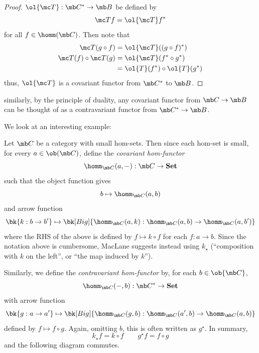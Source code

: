 \documentclass{fkbook}
\theoremstyle{snazzydefinition}
\begin{document}
\begin{adjustwidth}{1em}{1em}
\begin{proof}
    $\ol{\mc T} : \mb C^* \to \mb B$ be defined by
    \[
      \mc T f = \ol{\mc T} f^*
    \]
    for all $f \in \homm(\mb C)$. Then note that
    \begin{align*}
      \mc T(g \circ f)
      &= \ol{\mc T} ((g \circ f)^*) \\
      \mc T(f) \circ \mc T(g)
      &= \ol{\mc T} (f^* \circ g^*) \\
      &= \ol{T}(f^*) \circ \ol{T}(g^*)
    \end{align*}
    thus, $\ol{\mc T}$ is a covariant functor from $\mb C^*$ to $\mb
    B$.
  \end{proof}
  similarly, by the principle of duality, any covariant functor from
  $\mb C \to \mb B$ can be thought of as a contravariant functor from
  $\mb C^* \to \mb B$.

  We look at an interesting example:
  \begin{definition}
    Let $\mb C$ be a category with small hom-sets. Then since each
    hom-set is small, for every $a \in \ob(\mb C)$, define the
    \emph{covariant hom-functor}
    \[
      \homm_{\mb C}(a, -): \mb C \to \textbf{Set}
    \]
    such that the object function gives
    \[
      b \mapsto \homm_{\mb C}(a,b)
    \]
    and arrow function
    \[
      \bk{k : b \to b'} \mapsto \bk[Big]{\homm_{\mb C}(a,k) :
        \homm_{\mb C}(a,b) \to \homm_{\mb C}(a, b')}
    \]
    where the RHS of the above is defined by $f \mapsto k \circ f$ for
    each $f : a \to b$. Since the notation above is cumbersome,
    MacLane suggests instead using $k_\star$ (``composition with $k$ on
    the left'', or ``the map induced by $k$'').

    Similarly, we define the \emph{contravariant hom-functor} by, for
    each $b \in \ob{\mb C}$,
    \[
      \homm_{\mb C}(-,b) : \mb C^* \to \textbf{Set}
    \]
    with arrow function
    \[
      \bk{g : a \to a'} \mapsto \bk[Big]{\homm_{\mb C}(g, b) :
        \homm_{\mb C}(a',b) \to \homm_{\mb C}(a, b)}
    \]
    defined by $f \mapsto f \circ g$. Again, omitting $b$, this is
    often written as $g^\star$. In summary,
    \[
      k_\star f = k \circ f \qquad g^\star f = f \circ g
    \]
    and the following diagram commutes.
    \begin{figure}[H]
      \centering
      \tikzset{node distance=3cm, auto}
    \end{figure}
  \end{definition}


\end{adjustwidth}
\end{document}
